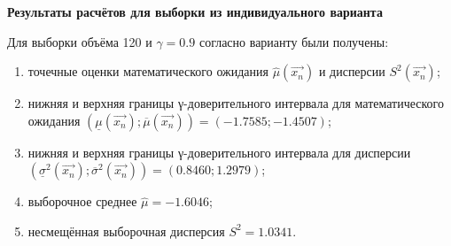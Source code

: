\documentclass[12pt,a4paper]{scrartcl}
\begin{document}
\newpage
{}
\begin{center}
\textbf {Результаты расчётов для выборки из индивидуального варианта}
\end{center}

Для выборки объёма 120 и $γ = 0.9$ согласно варианту были получены:

\begin{enumerate}
	\item точечные оценки математического ожидания $\hat{μ}(\overrightarrow {x_n})$ и дисперсии $S^2(\overrightarrow {x_n})$;
	\item нижняя и верхняя границы γ-доверительного интервала для математического ожидания $(\underline {μ}(\overrightarrow {x_n}); \overline {μ}(\overrightarrow {x_n})) = (-1.7585; -1.4507)$;
	\item нижняя и верхняя границы γ-доверительного интервала для дисперсии $(\underline {σ}^2 (\overrightarrow {x_n}); \overline {σ}^2 (\overrightarrow {x_n})) = (0.8460; 1.2979)$;
	\item выборочное среднее $ \hat{μ} = -1.6046$;
	\item несмещённая выборочная дисперсия  $S^2 = 1.0341$.
\end{enumerate}
\end{document}
